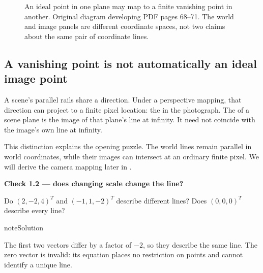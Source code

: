 \documentclass[letterpaper,11pt,english,openany,oneside]{jupyterBook}
\begin{document}
\begin{figure}[H]
\centering
\capstart

\noindent{}
\caption{An ideal point in one plane may map to a finite vanishing point in another. Original diagram developing PDF pages 68–71. The world and image panels are different coordinate spaces, not two claims about the same pair of coordinate lines.}\label{\detokenize{lectures/lecture01/projective:fig-lec01-projective}}\end{figure}


\subsection{A vanishing point is not automatically an ideal image point}
\label{\detokenize{lectures/lecture01/projective:a-vanishing-point-is-not-automatically-an-ideal-image-point}}
\sphinxAtStartPar
A scene’s parallel rails share a direction. Under a perspective mapping, that direction can project to a finite pixel location: the  in the photograph. The  of a scene plane is the image of that plane’s line at infinity. It need not coincide with the image’s own line at infinity.

\sphinxAtStartPar
This distinction explains the opening puzzle. The world lines remain parallel in world coordinates, while their images can intersect at an ordinary finite pixel. We will derive the camera mapping later in {\hyperref[\detokenize{lectures/lecture01/cameras:lec01-cameras}]{}}.

\begin{TextbookBox}
\textbf{Check 1.2 — does changing scale change the line?}\par\smallskip

\sphinxAtStartPar
Do \((2,-2,4)^T\) and \((-1,1,-2)^T\) describe different lines? Does \((0,0,0)^T\) describe every line?

\end{TextbookBox}

\begin{sphinxadmonition}{note}{Solution}

\sphinxAtStartPar
The first two vectors differ by a factor of \(-2\), so they describe the same line. The zero vector is invalid: its equation places no restriction on points and cannot identify a unique line.
\end{sphinxadmonition}
\end{document}
